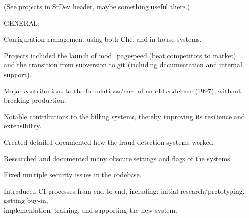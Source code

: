 \item (See projects in SrDev header, maybe something useful there.)

\item GENERAL:
\item Configuration management using both Chef and in-house systems.
\item Projects included the launch of mod\_pagespeed (beat competitors to market) and the transition from subversion to git (including documentation and internal support).
\item Major contributions to the foundations/core of an old codebase (1997), without breaking production.
\item Notable contributions to the billing systems, thereby improving its resilience and extensibility.
\item Created detailed documented how the fraud detection systems worked.
\item Researched and documented many obscure settings and flags of the systems.
\item Fixed multiple security issues in the codebase.
\item Introduced CI processes from end-to-end, including: initial research/prototyping, getting buy-in, \\ implementation, training, and supporting the new system.
